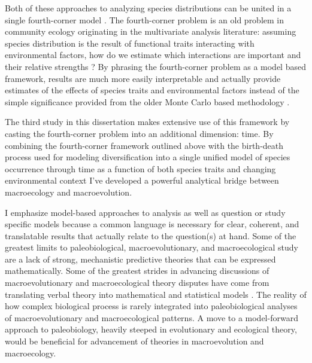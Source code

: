 Both of these approaches to analyzing species distributions can be united in a single fourth-corner model \citep{Warton2015a,Brown2014c}. The fourth-corner problem is an old problem in community ecology originating in the multivariate analysis literature: assuming species distribution is the result of functional traits interacting with environmental factors, how do we estimate which interactions are important and their relative strengths \citep{Legendre1997,Dray2008}? By phrasing the fourth-corner problem as a model based framework, results are much more easily interpretable and actually provide estimates of the effects of species traits and environmental factors instead of the simple significance provided from the older Monte Carlo based methodology \citep{Brown2014c,Jamil2013,Pollock2012,Pollock2015}.

The third study in this dissertation makes extensive use of this framework by casting the fourth-corner problem into an additional dimension: time. By combining the fourth-corner framework outlined above \citep{Warton2015a,Brown2014c} with the birth-death process used for modeling diversification into a single unified model of species occurrence through time as a function of both species traits and changing environmental context I've developed a powerful analytical bridge between macroecology and macroevolution.

I emphasize model-based approaches to analysis as well as question or study specific models because a common language is necessary for clear, coherent, and translatable results that actually relate to the question(s) at hand. Some of the greatest limits to paleobiological, macroevolutionary, and macroecological study are a lack of strong, mechanistic predictive theories that can be expressed mathematically. Some of the greatest strides in advancing discussions of macroevolutionary and macroecological theory disputes have come from translating verbal theory into mathematical and statistical models \citep{Raup1973,Nee1992,Felsenstein1985b,Hunt2006a,Hunt2007,Shipley2006}. The reality of how complex biological process is rarely integrated into paleobiological analyses of macroevolutionary and macroecological patterns. A move to a model-forward approach to paleobiology, heavily steeped in evolutionary and ecological theory, would be beneficial for advancement of theories in macroevolution and macroecology. 

